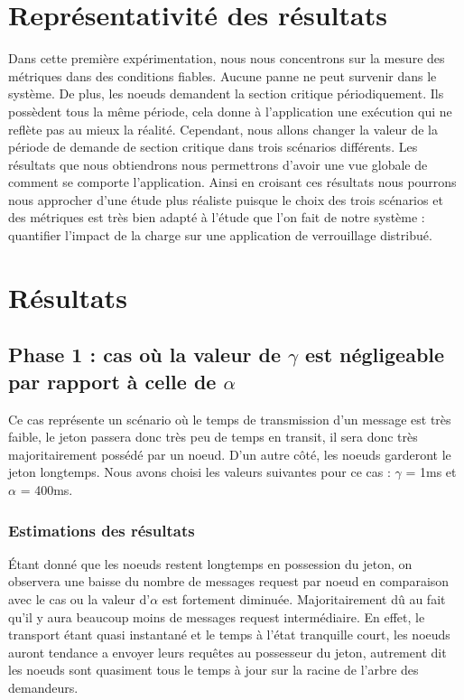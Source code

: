 \documentclass[12pt,a4paper]{article}
\begin{document}

\section{Représentativité des résultats}

Dans cette première expérimentation, nous nous concentrons sur la mesure des métriques dans des conditions fiables. Aucune panne ne peut survenir dans le système. De plus, les noeuds demandent la section critique périodiquement. Ils possèdent tous la même période, cela donne à l'application une exécution qui ne reflète pas au mieux la réalité. Cependant, nous allons changer la valeur de la période de demande de section critique dans trois scénarios différents. Les résultats que nous obtiendrons nous permettrons d'avoir une vue globale de comment se comporte l'application. Ainsi en croisant ces résultats nous pourrons nous approcher d'une étude plus réaliste puisque le choix des trois scénarios et des métriques est très bien adapté à l'étude que l'on fait de notre système : quantifier l'impact de la charge sur une application de verrouillage distribué.

\section{Résultats}

\subsection{Phase 1 : cas où la valeur de $\gamma$ est négligeable par rapport à celle de $\alpha$ \label{premier}}

Ce cas représente un scénario où le temps de transmission d'un message est très faible, le jeton passera donc très peu de temps en transit, il sera donc très majoritairement possédé par un noeud. D'un autre côté, les noeuds garderont le jeton longtemps. Nous avons choisi les valeurs suivantes pour ce cas : $\gamma$ = 1ms et $\alpha$ = 400ms. 
\subsubsection{Estimations des résultats}
Étant donné que les noeuds restent longtemps en possession du jeton, on observera une baisse du nombre de messages request par noeud en comparaison avec le cas ou la valeur d'$\alpha$ est fortement diminuée. Majoritairement dû au fait qu'il y aura beaucoup moins de messages request intermédiaire. En effet, le transport étant quasi instantané et le temps à l'état tranquille court, les noeuds auront tendance a envoyer leurs requêtes au possesseur du jeton, autrement dit les noeuds sont quasiment tous le temps à jour sur la racine de l'arbre des demandeurs.
\end{document}
